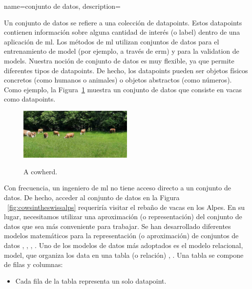 {name={conjunto de datos},
	description={Un conjunto de datos se refiere a una colección de \gls{datapoint}s. Estos 
		\gls{datapoint}s contienen información sobre alguna cantidad de interés (o \gls{label}) dentro 
		de una aplicación de \gls{ml}. Los métodos de \gls{ml} utilizan conjuntos de datos para el entrenamiento de \gls{model} (por ejemplo, a través de \gls{erm})
		y para la \gls{validation} de \gls{model}s. Nuestra noción de conjunto de datos es muy flexible, 
		ya que permite diferentes tipos de \gls{datapoint}s. De hecho, los \gls{datapoint}s pueden ser objetos físicos concretos
		(como humanos o animales) o objetos abstractos (como números).
		Como ejemplo, la Figura\ \ref{fig_cows_dataset} muestra un conjunto de datos que consiste en vacas como 
		\gls{datapoint}s. 
		\begin{figure}[H]
				\begin{center}
		\label{fig:cowsintheswissalps}
		\includegraphics[width=0.5\textwidth]{../../assets/CowsAustria.jpg}
		  \end{center}
		\caption{\label{fig_cows_dataset} A cowherd.}
	  \end{figure}
	   Con frecuencia, un ingeniero de \gls{ml}  no tiene acceso directo a un conjunto de datos. De hecho, acceder al conjunto de datos en la Figura 
       \ \ref{fig:cowsintheswissalps} requeriría visitar el rebaño de vacas en los Alpes. En su lugar, 
	   necesitamos utilizar una aproximación (o representación) del conjunto de datos que sea más conveniente para trabajar. 
       Se han desarrollado diferentes modelos matemáticos para la representación (o aproximación) de conjuntos de datos  
       \cite{silberschatz2019database}, \cite{abiteboul1995foundations}, \cite{hoberman2009data}, \cite{ramakrishnan2002database}. 
	   Uno de los modelos de datos más adoptados es el modelo relacional, \gls{model}, que organiza los \gls{data} 
       en una tabla (o relación) \cite{codd1970relational}, \cite{silberschatz2019database}.
	   Una tabla se compone de filas y columnas:
		\begin{itemize} 
		\item Cada fila de la tabla representa un solo \gls{datapoint}.

\end{itemize}}}
